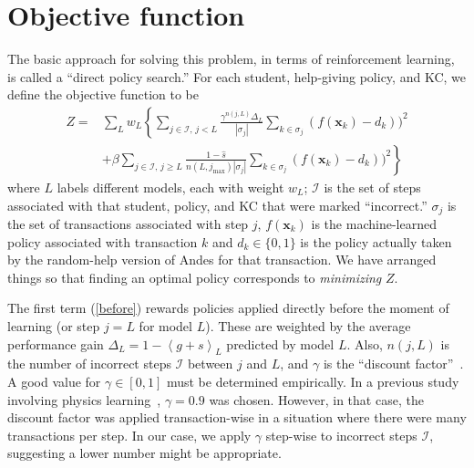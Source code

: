 \documentclass{edm_template}
\begin{document}
\section{Objective function}

The basic approach for solving this problem, in terms of reinforcement
learning, is called a ``direct policy search.''
For each student, help-giving policy, and KC, we define the objective 
function to be 
%
\begin{subequations}
  \label{objective}
  \begin{align}
  Z =& \sum_L w_L \left\{\sum_{j \in \mathcal{I},\,j<L}  
       \frac{\gamma^{n(j,L)} \Delta_L}{\left|\sigma_j\right|}
  \sum_{k\in \sigma_j} \left(f(\mathbf{x}_k)-d_k\right))^2 \right.
     \label{before} \\
  &+\beta \left. \sum_{j \in \mathcal{I},\,j \ge L} \frac{1-\hat{s}}
      {n(L,j_\mathrm{max})\left|\sigma_j\right|}
             \sum_{k\in \sigma_j} \left(f(\mathbf{x}_k)-d_k\right))^2
     \right\}
  \label{after}
  \end{align}
\end{subequations}
%
where $L$ labels different models, each with weight $w_L$;
$\mathcal{I}$ is the set of steps associated
with that student, policy, and KC that were marked ``incorrect.''  
$\sigma_j$ is the set of transactions associated with step $j$,
$f(\mathbf{x}_k)$ is the machine-learned policy associated
with transaction $k$ and
$d_k\in \{0,1\}$ is the
policy actually taken by the random-help version of Andes for that 
transaction.
We have arranged things so that finding an optimal policy 
corresponds to {\em minimizing} $Z$.

The first term (\ref{before}) rewards policies applied directly before
the moment of learning (or step $j=L$ for model $L$).  
These are weighted by the 
average performance gain $\Delta_L = 1-\left\langle g+s\right\rangle_L$ 
predicted by model $L$.
Also, $n(j,L)$ is the number
of incorrect steps $\mathcal{I}$ between $j$ and $L$, 
and $\gamma$ is the ``discount factor''~\cite{russell_artificial_2002}. 
A good value for $\gamma \in [0,1]$ must be determined empirically.
In a previous study involving physics learning~\cite{chi_empirically_2011}, 
$\gamma=0.9$ was chosen.
However, in that case, the discount factor was applied transaction-wise in 
a situation where there were many transactions per step.  In our case, 
we apply $\gamma$ step-wise to incorrect steps $\mathcal{I}$, 
suggesting a lower number might be appropriate.
\end{document}
